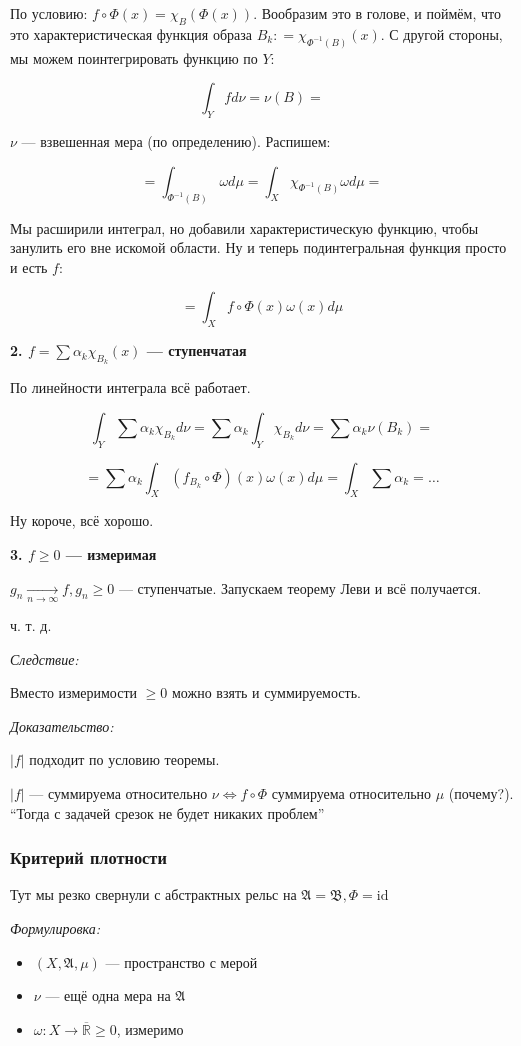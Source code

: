 \documentclass{article}
\def\rinf{\overline{\mathbb{R}}}
\def\goesto#1{\underset{#1}{\longrightarrow}}
\def\toinf#1{\goesto{#1 \rightarrow \infty}}
\def\ntoinf{\toinf{n}}
\begin{document}
По условию: $f \circ \Phi(x) = \chi_{B}(\Phi(x))$. Вообразим это в голове, и поймём, что это характеристическая функция образа $B_k: = \chi_{\Phi^{-1}(B)}(x)$. С другой стороны, мы можем поинтегрировать функцию по $Y:$

\[\int_{Y} f d\nu = \nu(B) = \]

$\nu$ --- взвешенная мера (по определению). Распишем:

\[= \int_{\Phi^{-1}(B)} \omega d\mu = \int_{X} \chi_{\Phi^{-1}(B)} \omega d\mu = \]

Мы расширили интеграл, но добавили характеристическую функцию, чтобы занулить его вне искомой области. Ну и теперь подинтегральная функция просто и есть $f$:

\[ = \int_{X} f \circ \Phi(x) \omega(x) d\mu\]

\textbf{2. $f = \sum \alpha_k \chi_{B_k}(x)$ --- ступенчатая}

По линейности интеграла всё работает.

\[\int_{Y} \sum \alpha_k \chi_{B_k} d\nu = \sum \alpha_k \int_{Y} \chi_{B_k} d\nu = \sum \alpha_k \nu(B_k) =\]

\[= \sum \alpha_k \int_{X} (f_{B_k} \circ \Phi)(x) \omega(x) d\mu = \int_{X} \sum \alpha_k = \ldots\]

Ну короче, всё хорошо.

\textbf{3. $f \ge 0$ --- измеримая}

$g_n \ntoinf f, g_n \ge 0$ --- ступенчатые. Запускаем теорему Леви и всё получается.

ч. т. д. 

\textit{Следствие:}

Вместо измеримости $\ge 0$ можно взять и суммируемость.

\textit{Доказательство:}

$|f|$ подходит по условию теоремы.

$|f|$ --- суммируема относительно $\nu \Leftrightarrow f \circ \Phi$ суммируема относительно $\mu$ (почему?). ``Тогда с задачей срезок не будет никаких проблем''

\subsubsection{Критерий плотности}

Тут мы резко свернули с абстрактных рельс на $\mathfrak{A} = \mathfrak{B}, \Phi = \text{id}$

\textit{Формулировка:}

\begin{itemize}
    \item $(X, \mathfrak{A}, \mu)$ --- пространство с мерой
    \item $\nu$ --- ещё одна мера на $\mathfrak{A}$
    \item $\omega: X \rightarrow \rinf \ge 0$, измеримо 
\end{itemize}
\end{document}
